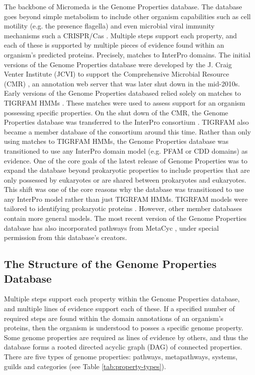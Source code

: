The backbone of Micromeda is the Genome Properties \cite{Haft2013} database. The database goes beyond simple metabolism to include other organism capabilities such as cell motility (e.g. the presence flagella) and even microbial viral immunity mechanisms such a CRISPR/Cas \cite{horvath2010crispr}. Multiple steps support each property, and each of these is supported by multiple pieces of evidence found within an organism's predicted proteins. Precisely, matches to InterPro domains. The initial versions of the Genome Properties database were developed by the J. Craig Venter Institute (JCVI) to support the Comprehensive Microbial Resource (CMR) \cite{Davidsen2010}, an annotation web server that was later shut down in the mid-2010s. Early versions of the Genome Properties databased relied solely on matches to TIGRFAM HMMs \cite{Haft2013, Novere2009}. These matches were used to assess support for an organism possessing specific properties. On the shut down of the CMR, the Genome Properties database was transferred \cite{finn2018} to the InterPro consortium \cite{Hunter2009}. TIGRFAM also became a member database of the consortium around this time. Rather than only using matches to TIGRFAM HMMs, the Genome Properties database was transitioned to use any InterPro domain model (e.g. PFAM or CDD domains) as evidence. One of the core goals of the latest release of Genome Properties was to expand the database beyond prokaryotic properties to include properties that are only possessed by eukaryotes or are shared between prokaryotes and eukaryotes. This shift was one of the core reasons why the database was transitioned to use any InterPro model rather than just TIGRFAM HMMs. TIGRFAM models were tailored to identifying prokaryotic proteins \cite{Haft2013}. However, other member databases contain more general models. The most recent version of the Genome Properties database has also incorporated pathways from MetaCyc \cite{karp2002metacyc}, under special permission from this database's creators.

\subsection{The Structure of the Genome Properties Database}

Multiple steps support each property within the Genome Properties database, and multiple lines of evidence support each of these. If a specified number of required steps are found within the domain annotations of an organism's proteins, then the organism is understood to posses a specific genome property. Some genome properties are required as lines of evidence by others, and thus the database forms a rooted directed acyclic graph (DAG) of connected properties. There are five types of genome properties: pathways, metapathways, systems, guilds and categories (see Table \ref{tab:property-types}). 


